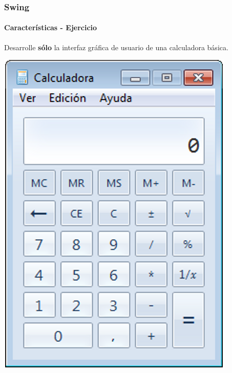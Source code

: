 \documentclass{beamer}
\begin{document}



	\begin{frame}
		\frametitle{Swing}
		\framesubtitle{Caracter\'isticas - Ejercicio}

        Desarrolle \textbf{s\'olo} la interfaz gr\'afica de usuario de una calculadora b\'asica.

	    \begin{center}
	        	\includegraphics[scale=.35]{images/calculadora.png}
	    \end{center}
	\end{frame}
\end{document}
